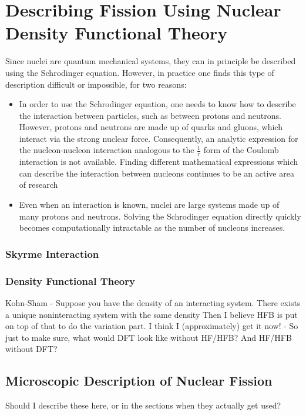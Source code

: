 \chapter{Describing Fission Using Nuclear Density Functional Theory}\label{chap:Model}
\maketitle

Since nuclei are quantum mechanical systems, they can in principle be described using the Schrodinger equation. However, in practice one finds this type of description difficult or impossible, for two reasons:

\begin{itemize}
\item In order to use the Schrodinger equation, one needs to know how to describe the interaction between particles, such as between protons and neutrons. However, protons and neutrons are made up of quarks and gluons, which interact via the strong nuclear force. Consequently, an analytic expression for the nucleon-nucleon interaction analogous to the $\frac{1}{r}$ form of the Coulomb interaction is not available. Finding different mathematical expressions which can describe the interaction between nucleons continues to be an active area of research \cite{lots of papers}
\item Even when an interaction is known, nuclei are large systems made up of many protons and neutrons. Solving the Schrodinger equation directly quickly becomes computationally intractable as the number of nucleons increases.
\end{itemize}

\subsection{Skyrme Interaction}

\subsection{Density Functional Theory}\label{sect:DFT}
Kohn-Sham - Suppose you have the density of an interacting system. There exists a unique noninteracting system with the same density
Then I believe HFB is put on top of that to do the variation part. I think I (approximately) get it now! - So just to make sure, what would DFT look like without HF/HFB? And HF/HFB without DFT?

\section{Microscopic Description of Nuclear Fission}
Should I describe these here, or in the sections when they actually get used?

